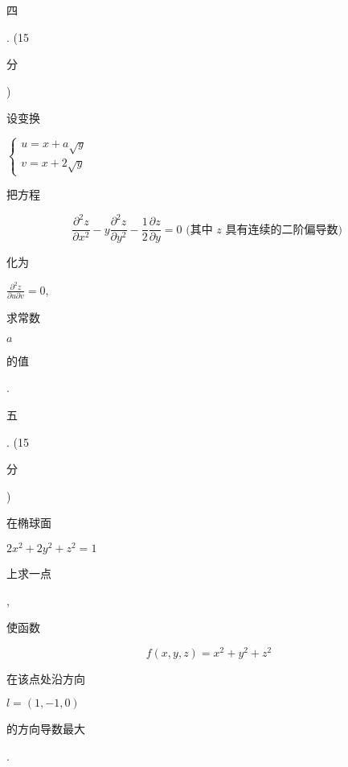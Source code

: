 \documentclass[10pt]{article}
\begin{document}
\begin{CJK}{UTF8}{mj}四\end{CJK}. (15 \begin{CJK}{UTF8}{mj}分\end{CJK}) \begin{CJK}{UTF8}{mj}设变换\end{CJK} $\left\{\begin{array}{l}u=x+a \sqrt{y} \\ v=x+2 \sqrt{y}\end{array}\right.$ \begin{CJK}{UTF8}{mj}把方程\end{CJK}
$$
\frac{\partial^{2} z}{\partial x^{2}}-y \frac{\partial^{2} z}{\partial y^{2}}-\frac{1}{2} \frac{\partial z}{\partial y}=0 \text { (其中 } z \text { 具有连续的二阶偏导数) }
$$
\begin{CJK}{UTF8}{mj}化为\end{CJK} $\frac{\partial^{2} z}{\partial u \partial v}=0$, \begin{CJK}{UTF8}{mj}求常数\end{CJK} $a$ \begin{CJK}{UTF8}{mj}的值\end{CJK}.

\begin{CJK}{UTF8}{mj}五\end{CJK}. (15 \begin{CJK}{UTF8}{mj}分\end{CJK}) \begin{CJK}{UTF8}{mj}在椭球面\end{CJK} $2 x^{2}+2 y^{2}+z^{2}=1$ \begin{CJK}{UTF8}{mj}上求一点\end{CJK}, \begin{CJK}{UTF8}{mj}使函数\end{CJK}
$$
f(x, y, z)=x^{2}+y^{2}+z^{2}
$$
\begin{CJK}{UTF8}{mj}在该点处沿方向\end{CJK} $l=(1,-1,0)$ \begin{CJK}{UTF8}{mj}的方向导数最大\end{CJK}.
\end{document}
